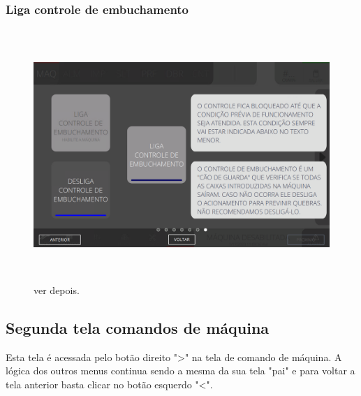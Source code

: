 \vspace*{\fill}

\newpage
\thispagestyle{fancy}

\vspace*{\fill}

\subsubsection{\small{Liga controle de embuchamento}}

\begin{figure}[h]
  \centering
  \includegraphics[width=576px,height=360px]{src/imagesFlexo/02-machine/e-7.png}
  \caption{ver depois.}
   \label{}
\end{figure}

\vspace*{\fill}

\newpage
\thispagestyle{fancy}

\vspace*{\fill}

\subsection{Segunda tela comandos de máquina}

Esta tela é acessada pelo botão direito "\textgreater" na tela de comando de máquina. A lógica dos outros menus continua sendo a mesma da sua tela "pai" e para voltar a tela anterior basta clicar no botão esquerdo "\textless{}".

\vspace{10pt}

